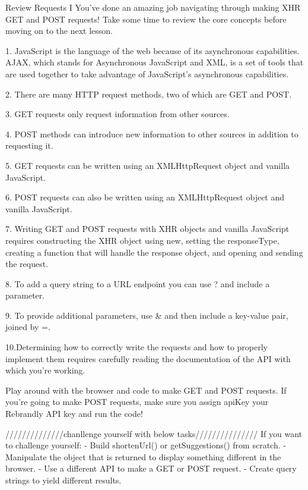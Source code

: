 Review Requests I
    You’ve done an amazing job navigating through making XHR GET and POST requests! Take some time to review the core concepts before moving on to the next lesson.

    1. JavaScript is the language of the web because of its asynchronous capabilities. AJAX, which stands for Asynchronous JavaScript and XML, is a set of tools that are used together to take advantage of JavaScript’s asynchronous capabilities.

    2. There are many HTTP request methods, two of which are GET and POST.

    3. GET requests only request information from other sources.

    4. POST methods can introduce new information to other sources in addition to requesting it.

    5. GET requests can be written using an XMLHttpRequest object and vanilla JavaScript.

    6. POST requests can also be written using an XMLHttpRequest object and vanilla JavaScript.

    7. Writing GET and POST requests with XHR objects and vanilla JavaScript requires constructing the XHR object using new, setting the responseType, creating a function that will handle the response object, and opening and sending the request.

    8. To add a query string to a URL endpoint you can use ? and include a parameter.

    9. To provide additional parameters, use & and then include a key-value pair, joined by =.

    10.Determining how to correctly write the requests and how to properly implement them requires carefully reading the documentation of the API with which you’re working.


Play around with the browser and code to make GET and POST requests. If you’re going to make POST requests, make sure you assign apiKey your Rebrandly API key and run the code!

//////////////chanllenge yourself with below tasks///////////////
If you want to challenge yourself:
    - Build shortenUrl() or getSuggestions() from scratch.
    - Manipulate the object that is returned to display something different in the browser.
    - Use a different API to make a GET or POST request.
    - Create query strings to yield different results.